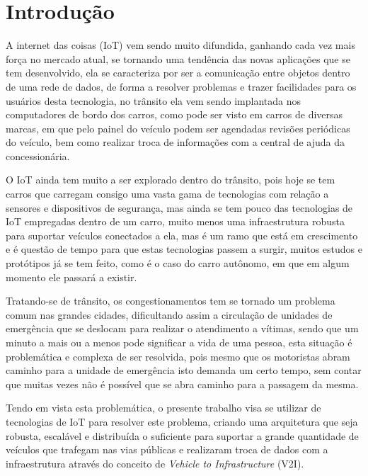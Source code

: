 \chapter{Introdução}
A internet das coisas (IoT) vem sendo muito difundida, ganhando cada vez mais força no mercado atual, se tornando uma tendência das novas aplicações que se tem desenvolvido, ela se caracteriza por ser a comunicação entre objetos dentro de uma rede de dados, de forma a resolver problemas e trazer facilidades para os usuários desta tecnologia, no trânsito ela vem sendo implantada nos computadores de bordo dos carros, como pode ser visto em carros de diversas marcas, em que pelo painel do veículo podem ser agendadas revisões periódicas do veículo, bem como realizar troca de informações com a central de ajuda da concessionária.

O IoT ainda tem muito a ser explorado dentro do trânsito, pois hoje se tem carros que carregam consigo uma vasta gama de tecnologias com relação a sensores e dispositivos de segurança, mas ainda se tem pouco das tecnologias de IoT empregadas dentro de um carro, muito menos uma infraestrutura robusta para suportar veículos conectados a ela, mas é um ramo que está em crescimento e é questão de tempo para que estas tecnologias passem a surgir, muitos estudos e protótipos já se tem feito, como é o caso do carro autônomo, em que em algum momento ele passará a existir.

Tratando-se de trânsito, os congestionamentos tem se tornado um problema comum nas grandes cidades, dificultando assim a circulação de unidades de emergência que se deslocam para realizar o atendimento a vítimas, sendo que um minuto a mais ou a menos pode significar a vida de uma pessoa, esta situação é problemática e complexa de ser resolvida, pois mesmo que os motoristas abram caminho para a unidade de emergência isto demanda um certo tempo, sem contar que muitas vezes não é possível que se abra caminho para a passagem da mesma.

Tendo em vista esta problemática, o presente trabalho visa se utilizar de tecnologias de IoT para resolver este problema, criando uma arquitetura que seja robusta, escalável e distribuída o suficiente para suportar a grande quantidade de veículos que trafegam nas vias públicas e realizaram troca de dados com a infraestrutura através do conceito de \textit{Vehicle to Infrastructure} (V2I).


